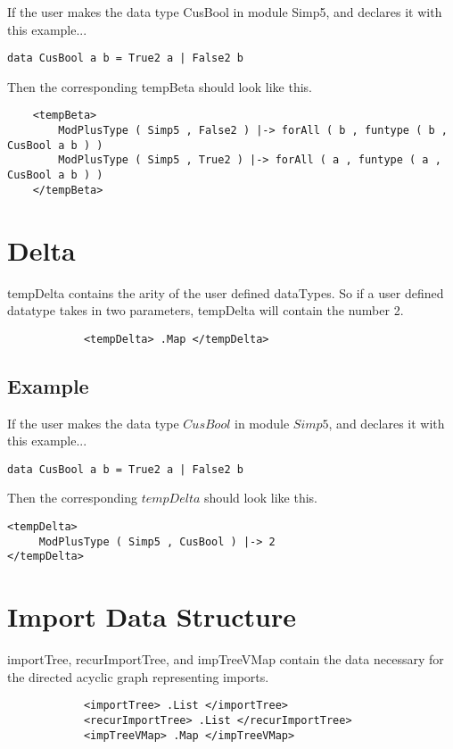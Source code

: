If the user makes the data type CusBool in module Simp5, and declares it with this example...
\begin{lstlisting}
data CusBool a b = True2 a | False2 b
\end{lstlisting}

Then the corresponding tempBeta should look like this.
\begin{lstlisting}
    <tempBeta>
        ModPlusType ( Simp5 , False2 ) |-> forAll ( b , funtype ( b , CusBool a b ) )
        ModPlusType ( Simp5 , True2 ) |-> forAll ( a , funtype ( a , CusBool a b ) )
    </tempBeta>

\end{lstlisting}

\section{Delta}

tempDelta contains the arity of the user defined dataTypes. So if a user defined datatype takes in two parameters, tempDelta will contain the number 2.

\begin{lstlisting}
            <tempDelta> .Map </tempDelta>
\end{lstlisting}

\subsection{Example}
If the user makes the data type $CusBool$ in module $Simp5$, and declares it with this example...
\begin{lstlisting}
data CusBool a b = True2 a | False2 b
\end{lstlisting}

Then the corresponding $tempDelta$ should look like this.

\begin{lstlisting}
<tempDelta>
     ModPlusType ( Simp5 , CusBool ) |-> 2
</tempDelta>
\end{lstlisting}

\section{Import Data Structure}

importTree, recurImportTree, and impTreeVMap contain the data necessary for the directed acyclic graph representing imports.

\begin{lstlisting}
            <importTree> .List </importTree>
            <recurImportTree> .List </recurImportTree>
            <impTreeVMap> .Map </impTreeVMap>
\end{lstlisting}

